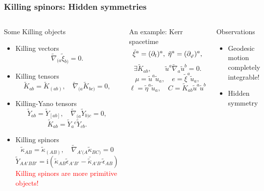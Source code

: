 \documentclass[10pt]{beamer}
\theoremstyle{plain}
\begin{document}
\begin{frame}
\frametitle{Killing spinors: Hidden symmetries}
\begin{columns}
\column{7.3cm}
\vspace{-4mm}
\begin{block}{ Some Killing objects }
\begin{itemize}
\item Killing vectors \[\tilde{\nabla}_{(a}\tilde{\xi}_{b)}=0.
  \]
\vspace{-5mm}
 \item Killing tensors
   \[ \tilde{K}_{ab}=\tilde{K}_{(ab)},\quad \tilde{\nabla}_{(a}\tilde{K}_{bc)}=0,
   \]
\vspace{-5mm}
\item Killing-Yano tensors
\[\tilde{Y}_{ab}=\tilde{Y}_{[ab]}, \quad \tilde{\nabla}_{(a}\tilde{Y}_{b)c}=0,\]
\vspace{-5mm}
 \[
 \tilde{K}_{ab}=\tilde{Y}_{a}{}^{c}\tilde{Y}_{cb}.
\]
\vspace{-5mm}
\item Killing spinors 
\vspace{-2mm}
\[\tilde{\kappa}_{AB}=\tilde{\kappa}_{(AB)}, \quad \tilde{\nabla}_{A'(A}\tilde{\kappa}_{BC)}=0\]
\vspace{-5mm}
\[ \tilde{Y}_{AA'BB'}=\mbox{i}(\tilde{\kappa}_{AB}\tilde{\epsilon}_{A'B'} - \bar{\tilde{\kappa}}_{A'B'}\tilde{\epsilon}_{AB}) \]
\textcolor{red}{\quad Killing spinors are more primitive objects!}
\end{itemize}
\end{block}
\column{4.3cm}
\vspace{-4mm}
\begin{block}{An example: Kerr spacetime}
\[ \tilde{\xi}^{a}=(\partial_{t})^a, \hspace{1mm} \tilde{\eta}^{a}
=(\partial_{\varphi})^{a},\] \[  \exists \tilde{K}_{ab}, \qquad \tilde{u}^{a}\tilde{\nabla}_{a}\tilde{u}^b=0.
\]
\[\mu=\tilde{u}^{a}\tilde{u}_{a}, \quad e=\tilde{\xi}^a\tilde{u}_{a},\]\[\ell=\tilde{\eta}^{a}\tilde{u}_{a}, \quad  C=\tilde{K}_{ab}\tilde{u}^a\tilde{u}^b\]
\end{block}
\vspace{2mm}
\begin{alertblock}{Observations}
\begin{itemize}
\item Geodesic motion completely integrable!
\item Hidden symmetry %
\end{itemize}
\end{alertblock}
\end{columns}
\end{frame}
\end{document}
